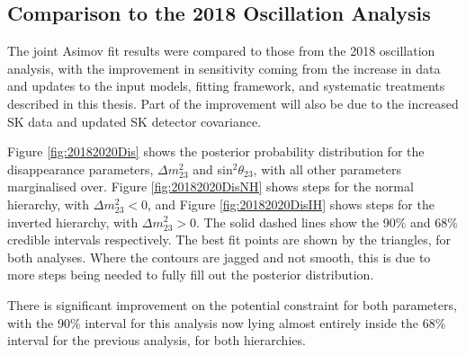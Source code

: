 \subsection{Comparison to the 2018 Oscillation Analysis}\label{sec:joint2018}

The joint Asimov fit results were compared to those from the 2018 oscillation analysis, with the improvement in sensitivity coming from the increase in data and updates to the input models, fitting framework, and systematic treatments described in this thesis. Part of the improvement will also be due to the increased SK data and updated SK detector covariance.

Figure \ref{fig:20182020Dis} shows the posterior probability distribution for the disappearance parameters, $\Delta m^{2}_{23}$ and sin$^{2}\theta_{23}$, with all other parameters marginalised over. Figure \ref{fig:20182020DisNH} shows steps for the normal hierarchy, with $\Delta m^{2}_{23}<0$,  and Figure \ref{fig:20182020DisIH} shows steps for the inverted hierarchy, with $\Delta m^{2}_{23}>0$. The solid dashed lines show the 90$\%$ and 68$\%$ credible intervals respectively. The best fit points are shown by the triangles, for both analyses. Where the contours are jagged and not smooth, this is due to more steps being needed to fully fill out the posterior distribution.

There is significant improvement on the potential constraint for both parameters, with the 90$\%$ interval for this analysis now lying almost entirely inside the 68$\%$ interval for the previous analysis, for both hierarchies.

